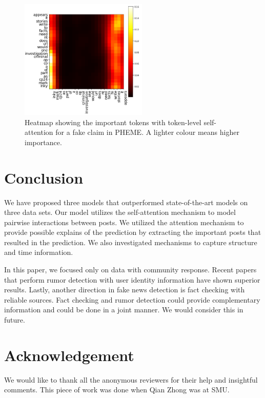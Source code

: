 \documentclass[letterpaper]{article} %
\begin{document}
\begin{figure}[t]
\centering
\includegraphics[width=0.9 0.8 \columnwidth,height=2.25in ]{word_level_attention_cmyk.png}
\caption{Heatmap showing the important tokens with token-level self-attention for a fake claim in PHEME. A lighter colour means higher importance.}
\label{fig:heatmap}
\end{figure}

\section{Conclusion}

We have proposed three models that outperformed state-of-the-art models on three data sets. Our model utilizes the self-attention mechanism to model pairwise interactions between posts. We utilized the attention mechanism to provide possible explains of the prediction by extracting the important posts that resulted in the prediction. We also investigated mechanisms to capture structure and time information.

In this paper, we focused only on data with community response. Recent papers that perform rumor detection with user identity information have shown superior results.
Lastly, another direction in fake news detection is fact checking with reliable sources. Fact checking and rumor detection could provide complementary information and could be done in a joint manner. We would consider this in future.

\section*{Acknowledgement}
We would like to thank all the anonymous reviewers for their help and insightful comments. This piece of work was done when Qian Zhong was at SMU.
\end{document}
